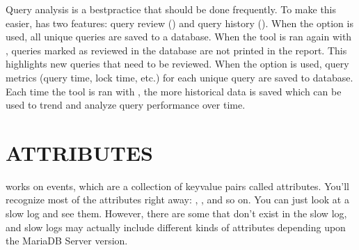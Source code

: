 \documentclass[letterpaper,10pt,english]{sphinxmanual}
\begin{document}
Query analysis is a best\sphinxhyphen{}practice that should be done frequently.  To
make this easier,  has two features: query review
({\hyperref[\detokenize{mariadb-query-digest:cmdoption-mariadb-query-digest-review}]{}}) and query history ({\hyperref[\detokenize{mariadb-query-digest:cmdoption-mariadb-query-digest-history}]{}}).  When the {\hyperref[\detokenize{mariadb-query-digest:cmdoption-mariadb-query-digest-review}]{}}
option is used, all unique queries are saved to a database.  When the
tool is ran again with {\hyperref[\detokenize{mariadb-query-digest:cmdoption-mariadb-query-digest-review}]{}}, queries marked as reviewed in
the database are not printed in the report.  This highlights new queries
that need to be reviewed.  When the {\hyperref[\detokenize{mariadb-query-digest:cmdoption-mariadb-query-digest-history}]{}} option is used,
query metrics (query time, lock time, etc.) for each unique query are
saved to database.  Each time the tool is ran with {\hyperref[\detokenize{mariadb-query-digest:cmdoption-mariadb-query-digest-history}]{}}, the
more historical data is saved which can be used to trend and analyze
query performance over time.


\section{ATTRIBUTES}
\label{\detokenize{mariadb-query-digest:attributes}}
 works on events, which are a collection of key\sphinxhyphen{}value pairs
called attributes.  You’ll recognize most of the attributes right away:
, , and so on.  You can just look at a slow log
and see them.  However, there are some that don’t exist in the slow log,
and slow logs may actually include different kinds of attributes depending
upon the MariaDB Server version.
\end{document}
